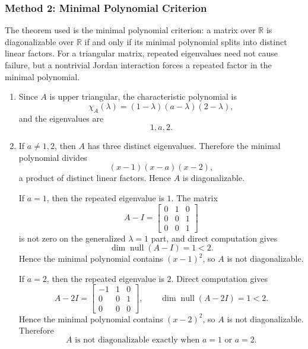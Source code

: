 \documentclass[12pt]{article}
\newcommand{\R}{\mathbb{R}}
\newcommand{\Null}{\operatorname{null}}
\begin{document}
\newpage
\subsubsection{Method 2: Minimal Polynomial Criterion}
The theorem used is the minimal polynomial criterion: a matrix over $\R$ is diagonalizable over $\R$ if and only if its minimal polynomial splits into distinct linear factors. For a triangular matrix, repeated eigenvalues need not cause failure, but a nontrivial Jordan interaction forces a repeated factor in the minimal polynomial.

\begin{enumerate}[label=(\alph*)]
  \item Since $A$ is upper triangular, the characteristic polynomial is
  \[
  \chi_A(\lambda)=(1-\lambda)(a-\lambda)(2-\lambda),
  \]
  and the eigenvalues are
  \[
  \boxed{1,a,2.}
  \]

  \item If $a\ne1,2$, then $A$ has three distinct eigenvalues. Therefore the minimal polynomial divides
  \[
  (x-1)(x-a)(x-2),
  \]
  a product of distinct linear factors. Hence $A$ is diagonalizable.

  If $a=1$, then the repeated eigenvalue is $1$. The matrix
  \[
  A-I=\begin{bmatrix}
  0&1&0\\0&0&1\\0&0&1
  \end{bmatrix}
  \]
  is not zero on the generalized $\lambda=1$ part, and direct computation gives
  \[
  \dim\Null(A-I)=1<2.
  \]
  Hence the minimal polynomial contains $(x-1)^2$, so $A$ is not diagonalizable.

  If $a=2$, then the repeated eigenvalue is $2$. Direct computation gives
  \[
  A-2I=\begin{bmatrix}
  -1&1&0\\0&0&1\\0&0&0
  \end{bmatrix},
  \qquad
  \dim\Null(A-2I)=1<2.
  \]
  Hence the minimal polynomial contains $(x-2)^2$, so $A$ is not diagonalizable.
  Therefore
  \[
  \boxed{A\text{ is not diagonalizable exactly when }a=1\text{ or }a=2.}
  \]


\end{enumerate}
\end{document}
